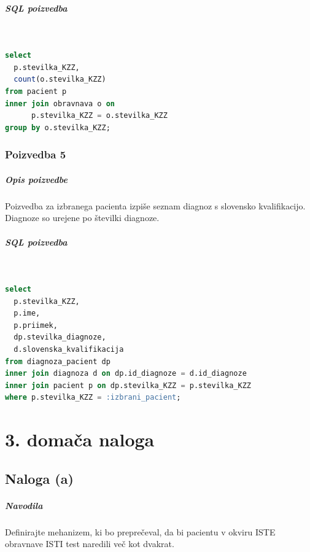 \documentclass[a4paper,12pt]{report}
\begin{document}
\paragraph{SQL poizvedba}\mbox{}\\
\begin{lstlisting}[language = SQL]
select
  p.stevilka_KZZ,
  count(o.stevilka_KZZ)
from pacient p
inner join obravnava o on 
      p.stevilka_KZZ = o.stevilka_KZZ
group by o.stevilka_KZZ;
\end{lstlisting}

\subsection*{Poizvedba 5}
\paragraph{Opis poizvedbe}
Poizvedba za izbranega pacienta izpiše seznam diagnoz s slovensko kvalifikacijo. Diagnoze so urejene po številki diagnoze.

\paragraph{SQL poizvedba}\mbox{}\\
\begin{lstlisting}[language = SQL]
select
  p.stevilka_KZZ,
  p.ime,
  p.priimek,
  dp.stevilka_diagnoze,
  d.slovenska_kvalifikacija
from diagnoza_pacient dp
inner join diagnoza d on dp.id_diagnoze = d.id_diagnoze
inner join pacient p on dp.stevilka_KZZ = p.stevilka_KZZ
where p.stevilka_KZZ = :izbrani_pacient;
\end{lstlisting}

\chapter*{3. domača naloga}

\section*{Naloga (a)}
\paragraph{Navodila}
Definirajte mehanizem, ki bo preprečeval, da bi pacientu v okviru ISTE obravnave ISTI test naredili več kot dvakrat.
\end{document}
